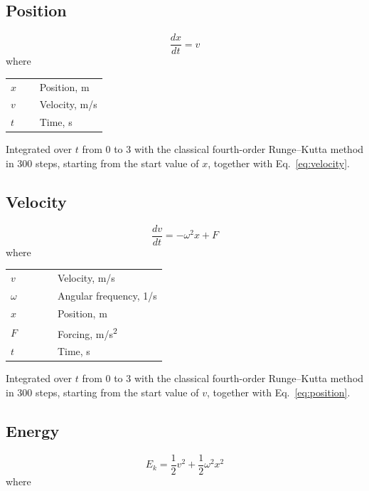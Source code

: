 \documentclass[11pt,a4paper]{article}
\begin{document}
\subsection{Position}
\begin{equation}
  \frac{dx}{dt} = v
  \label{eq:position}
\end{equation}
\noindent where

\noindent\begin{tabular}{@{\quad}l@{\quad}p{0.7\linewidth}@{}}
  $x$ & Position, \si{m} \\
  $v$ & Velocity, \si{m/s} \\
  $t$ & Time, \si{s} \\
\end{tabular}

\noindent Integrated over $t$ from $0$ to $3$ with the classical fourth-order Runge–Kutta method in 300 steps, starting from the start value of $x$, together with Eq.~\eqref{eq:velocity}.

\subsection{Velocity}
\begin{equation}
  \frac{dv}{dt} = -\omega^2 x + F
  \label{eq:velocity}
\end{equation}
\noindent where

\noindent\begin{tabular}{@{\quad}l@{\quad}p{0.7\linewidth}@{}}
  $v$ & Velocity, \si{m/s} \\
  $\omega$ & Angular frequency, \si{1/s} \\
  $x$ & Position, \si{m} \\
  $F$ & Forcing, \si{m/s^{2}} \\
  $t$ & Time, \si{s} \\
\end{tabular}

\noindent Integrated over $t$ from $0$ to $3$ with the classical fourth-order Runge–Kutta method in 300 steps, starting from the start value of $v$, together with Eq.~\eqref{eq:position}.

\subsection{Energy}
\begin{equation}
  E_k = \frac{1}{2} v^2 + \frac{1}{2} \omega^2 x^2
  \label{eq:energy}
\end{equation}
\noindent where
\end{document}
